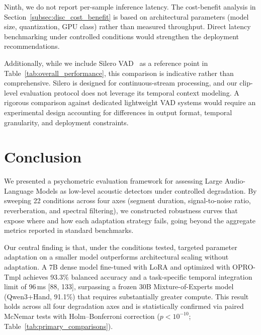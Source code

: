 \documentclass[11pt,a4paper]{article}
\begin{document}
Ninth, we do not report per-sample inference latency. The cost-benefit analysis in Section~\ref{subsec:disc_cost_benefit} is based on architectural parameters (model size, quantization, GPU class) rather than measured throughput. Direct latency benchmarking under controlled conditions would strengthen the deployment recommendations.

Additionally, while we include Silero VAD~\cite{silero_vad_github} as a reference point in Table~\ref{tab:overall_performance}, this comparison is indicative rather than comprehensive. Silero is designed for continuous-stream processing, and our clip-level evaluation protocol does not leverage its temporal context modeling. A rigorous comparison against dedicated lightweight VAD systems would require an experimental design accounting for differences in output format, temporal granularity, and deployment constraints.


\section{Conclusion}
\label{sec:conclusion}

We presented a psychometric evaluation framework for assessing Large Audio-Language Models as low-level acoustic detectors under controlled degradation. By sweeping 22 conditions across four axes (segment duration, signal-to-noise ratio, reverberation, and spectral filtering), we constructed robustness curves that expose where and how each adaptation strategy fails, going beyond the aggregate metrics reported in standard benchmarks.

Our central finding is that, under the conditions tested, targeted parameter adaptation on a smaller model outperforms architectural scaling without adaptation. A 7B dense model fine-tuned with LoRA and optimized with OPRO-Tmpl achieves 93.3\% balanced accuracy and a task-specific temporal integration limit of 96\,ms [88, 133], surpassing a frozen 30B Mixture-of-Experts model (Qwen3+Hand, 91.1\%) that requires substantially greater compute. This result holds across all four degradation axes and is statistically confirmed via paired McNemar tests with Holm--Bonferroni correction ($p < 10^{-10}$; Table~\ref{tab:primary_comparisons}).
\end{document}
